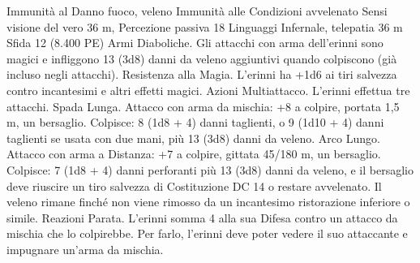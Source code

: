 \begin{multicols}{2}
Immunità al Danno fuoco, veleno
Immunità alle Condizioni avvelenato
Sensi visione del vero 36 m, Percezione passiva 18
Linguaggi Infernale, telepatia 36 m
Sfida 12 (8.400 PE)
Armi Diaboliche. Gli attacchi con arma dell’erinni sono magici e
infliggono 13 (3d8) danni da veleno aggiuntivi quando
colpiscono (già incluso negli attacchi).
Resistenza alla Magia. L’erinni ha +1d6 ai tiri salvezza
contro incantesimi e altri effetti magici.
Azioni
Multiattacco. L’erinni effettua tre attacchi.
Spada Lunga. Attacco con arma da mischia: +8 a colpire,
portata 1,5 m, un bersaglio.
Colpisce: 8 (1d8 + 4) danni taglienti, o 9 (1d10 + 4) danni
taglienti se usata con due mani, più 13 (3d8) danni da veleno.
Arco Lungo. Attacco con arma a Distanza: +7 a colpire, gittata
45/180 m, un bersaglio.
Colpisce: 7 (1d8 + 4) danni perforanti più 13 (3d8) danni da
veleno, e il bersaglio deve riuscire un tiro salvezza di
Costituzione DC 14 o restare avvelenato. Il veleno rimane finché
non viene rimosso da un incantesimo ristorazione inferiore o
simile.
Reazioni
Parata. L’erinni somma 4 alla sua Difesa contro un attacco da
mischia che lo colpirebbe. Per farlo, l’erinni deve poter vedere il
suo attaccante e impugnare un’arma da mischia.
 

\end{multicols}
